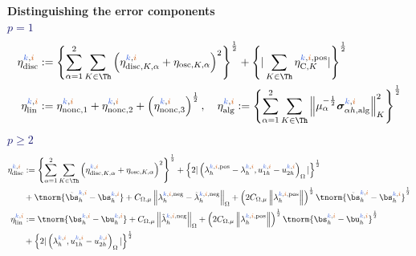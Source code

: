 \begin{frame}
\begin{overprint}
\textcolor{cadmiumgreen}{\textbf{Distinguishing the error components}}
\\
\textcolor{midnightblue}{\textbf{$p=1$}}
\vspace*{-0.6 cm}
\small{
\begin{equation*}
  \begin{split}
  \eta_{\mathrm{disc}}^{\kk,\ii} & := \left\{\sum_{\alpha=1}^2 \sum_{K \in \Th} \left(\eta_{\mathrm{disc},K,\alpha}^{\kk,\ii} + \eta_{\mathrm{osc},K,\alpha} \right)^2  \right\}^{\frac{1}{2}} + \left\{|\sum_{K \in \Th} \eta_{\mathrm{C},K}^{\kk,\ii,\mathrm{pos}} |  \right\}^{\frac{1}{2}} \\
  \eta_{\mathrm{lin}}^{\kk,\ii} & := \eta_{\mathrm{nonc}, 1}^{\kk,\ii} + \eta_{\mathrm{nonc}, 2}^{\kk,\ii} + \left(\eta_{\mathrm{nonc}, 3}^{\kk,\ii} \right)^{\frac{1}{2}}, \quad   \eta_{\mathrm{alg}}^{\kk,\ii} := \left\{\sum_{\alpha=1}^2 \sum_{K \in \Th} \left\| \mu_{\alpha}^{-\frac{1}{2}} {\bm \sigma}_{\alpha h, \mathrm{alg}}^{\kk,\ii} \right\|_K^2 \right\}^{\frac{1}{2}}
  \end{split}
\end{equation*}
\vspace*{-0.4 cm}
\textcolor{midnightblue}{\textbf{$p \geq 2$}}
\vspace*{-0.3 cm}
\begin{equation*}
  \begin{split}
    \eta_{\mathrm{disc}}^{\kk,\ii} & := \left\{\sum_{\alpha=1}^2 \sum_{K \in \Th} \left(\eta_{\mathrm{disc},K,\alpha}^{\kk,\ii} + \eta_{\mathrm{osc},K,\alpha} \right)^2  \right\}^{\frac{1}{2}}
    + \left\{2 |\left(\lambda_h^{\kk,\ii,\mathrm{pos}} - \lambda_h^{\kk,\ii}, u_{1h}^{\kk,\ii} - u_{2h}^{\kk,\ii} \right)_{\Omega} |  \right\}^{\frac{1}{2}} \\
    & + \tnorm{\tilde{\bs}_h^{\kk,\ii} - {\bs}_h^{\kk,\ii}}
    + C_{\Omega,\mu} \left\| \lambda_h^{\kk,\ii,\mathrm{neg}} - \tilde{\lambda}_{h}^{\kk,\ii,\mathrm{neg}} \right\|_{\Omega} + \left(2 C_{\Omega,\mu} \left\|\lambda_h^{\kk,\ii,\mathrm{pos}} \right\|  \right)^{\frac{1}{2}} \tnorm{\tilde{\bs}_h^{\kk,\ii} - {\bs}_h^{\kk,\ii}}^{\frac{1}{2}}\\
    \eta_{\mathrm{lin}}^{\kk,\ii} & := \tnorm{{\bs}_h^{\kk,\ii} - {\bu}_h^{\kk,\ii}} + C_{\Omega,\mu} \left\| \tilde{\lambda}_{h}^{\kk,\ii,\mathrm{neg}} \right\|_{\Omega} + \left(2 C_{\Omega,\mu} \left\|\lambda_h^{\kk,\ii,\mathrm{pos}} \right\|  \right)^{\frac{1}{2}}  \tnorm{{\bs}_h^{\kk,\ii} - {\bu}_h^{\kk,\ii}}^{\frac{1}{2}}
    \\
    & + \left\{2 |\left(\lambda_h^{\kk,\ii}, u_{1h}^{\kk,\ii} - u_{2h}^{\kk,\ii} \right)_{\Omega} | \right\}^{\frac{1}{2}}
  \end{split}
\end{equation*}
}


\end{overprint}
\end{frame}
